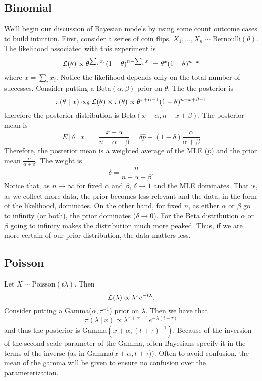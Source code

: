\subsection{Binomial}
We'll begin our discussion of Bayesian models by using some count outcome cases to build 
intuition. First, consider a series of coin flips, $X_1, \ldots, X_n \sim \mbox{Bernoulli}(\theta)$.
The likelihood associated with this experiment is
$$
{\cal L}(\theta) \propto \theta^{\sum_i x_i} (1 - \theta)^{n-\sum_i x_i} = \theta^x (1 - \theta)^{n-x}
$$
where $x = \sum_i x_i$. Notice the likelihood depends only on the total number of successes.
Consider putting a Beta$(\alpha, \beta)$ prior on $\theta$. The the posterior is 
$$
\pi(\theta ~|~ x) \propto_\theta {\cal L}(\theta) \times \pi(\theta) \propto \theta^{x + \alpha - 1} (1 - \theta)^{n - x + \beta - 1}
$$
therefore the posterior distribution is Beta$(x + \alpha, n - x + \beta)$. The posterior mean is
$$
E[\theta ~|~ x] = \frac{x + \alpha}{n + \alpha + \beta} 
= \delta \hat p + (1 - \delta) \frac{\alpha}{\alpha + \beta}
$$
Therefore, the posterior mean is a weighted average of the MLE ($\hat p$) and the prior
mean $\frac{\alpha}{\alpha + \beta}$. The weight is 
$$
\delta = \frac{n}{n + \alpha + \beta}.
$$
Notice that, as $n \rightarrow \infty$ for fixed $\alpha$ and $\beta$, $\delta \rightarrow 1$ and
the MLE
dominates. That is, as we collect more data, the prior becomes less relevant
and the data, in the form of the likelihood, dominates. On the other hand,
for fixed $n$, as either $\alpha$ or $\beta$ go to infinity (or both), the prior
dominates ($\delta \rightarrow 0$). For the Beta distribution $\alpha$ or $\beta$ going to infinity makes
the distribution much more peaked. Thus, if we are more certain of our prior
distribution, the data matters less. 


\subsection{Poisson}
Let $X \sim \mbox{Poisson}(t\lambda)$. Then 
$$
{\cal L}(\lambda) \propto \lambda^x e^{-t \lambda}.
$$
Consider putting a Gamma($\alpha, \tau^{-1}$) prior on $\lambda$. Then
we have that
$$
\pi(\lambda ~|~ x) \propto \lambda^{x + \alpha - 1} e^{-\lambda (t + \tau)} 
$$
and thus the posterior is Gamma$(x + \alpha, (t + \tau)^{-1})$. Because of
the inversion of the second scale parameter of the Gamma, often Bayesians
specify it in the terms of the inverse (as in Gamma($x + \alpha, t + \tau$)). 
Often to avoid confusion, the mean of the gamma will be given to ensure no
confusion over the parameterization.

